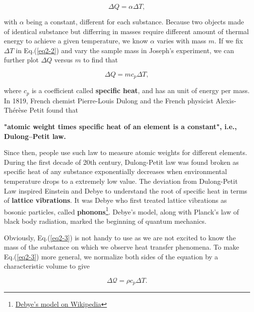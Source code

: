 \begin{equation}
    \Delta Q = \alpha\Delta T,
    \label{eq2-2}
\end{equation}

with $\alpha$ being a constant, different for each substance. Because two objects made of identical substance but differring in masses require different amount of thermal energy to achieve a given temperature, we know $\alpha$ varies with mass $m$. If we fix $\Delta T$ in Eq.(\ref{eq2-2}) and vary the sample mass in Joseph's experiment, we can further plot $\Delta Q$ versus $m$ to find that

\begin{equation}
    \Delta Q = mc_p\Delta T,
    \label{eq2-3}
\end{equation}

where $c_p$ is a coefficient called \textbf{specific heat}, and has an unit of energy per mass. In 1819, French chemist Pierre-Louis Dulong and the French physicist Alexis-Thérèse Petit found that 

\begin{docspec}
    \textbf{"atomic weight times specific heat of an element is a constant", i.e., Dulong–Petit law.}
\end{docspec} 

Since then, people use such law to measure atomic weights for different elements. During the first decade of 20th century, Dulong-Petit law was found broken as specific heat of any substance exponentially decreases when environmental temperature drops to a extremely low value. The deviation from Dulong-Petit Law inspired Einstein and Debye to understand the root of specific heat in terms of \textbf{lattice vibrations}. It was Debye who first treated lattice vibrations as bosonic particles, called \textbf{phonons}\footnote{\href{https://en.wikipedia.org/wiki/Debye_model}{Debye's model on Wikipedia}}. Debye's model, along with Planck's law of black body radiation, marked the beginning of quantum mechanics.

Obviously, Eq.(\ref{eq2-3}) is not handy to use as we are not excited to know the mass of the substance on which we observe heat transfer phenomena. To make Eq.(\ref{eq2-3}) more general, we normalize both sides of the equation by a characteristic volume to give

\begin{equation}
    \Delta\mathcal{Q}=\rho c_p\Delta T.
    \label{eq2-4}
\end{equation}

